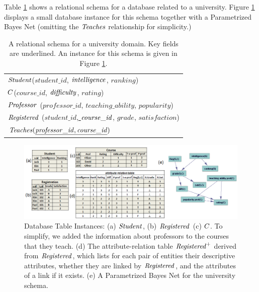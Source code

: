 \documentclass{article}
\begin{document}
Table \ref{table:university-schema} shows a relational schema for a database related to a university.
 Figure \ref{fig:university-tables} displays a small database instance for this schema together with a Parametrized Bayes Net (omitting the $\it{Teaches}$ relationship for simplicity.) 
\begin{table}[tbp] \centering
\begin{tabular}
[c]{|l|}\hline
$\mathit{Student}$(\underline{$student\_id$}, $\mathit{intelligence}$, $ranking$)\\
$C$(\underline{$course\_id$}, $\mathit{difficulty}$, $rating$)\\ 
$\mathit{Professor}$ (\underline{$professor\_id$}, $teaching\_ability$, $popularity$)\\
$\mathit{Registered}$ (\underline{$student\_id$, $\it{course}\_id$}, $grade$, $satisfaction$)\\
$\it{Teaches}(\underline{\it{professor\_id, course\_id}})$
\\
\hline
\end{tabular}
\caption{A relational schema for a university domain. Key fields are underlined. An instance for this schema is given in Figure \ref{fig:university-tables}.
\label{table:university-schema}} 
\end{table}
 
\begin{figure}[htbp] %
   \centering
   \includegraphics[width=7in]{figures/university-tables3.png} 
  \caption{Database Table Instances: (a) $\mathit{Student}$, (b) $\mathit{Registered}$ (c) $C$. To simplify, we added the information about professors to the courses that they teach.  (d) The attribute-relation table $\mathit{Registered}^{+}$ derived from $\mathit{Registered}$, which lists for each pair of entities their descriptive attributes, whether they are linked by $\mathit{Registered}$, and the attributes of a link if it exists. (e) A Parametrized Bayes Net for the university schema.}
   \label{fig:university-tables}
\end{figure}
\end{document}
